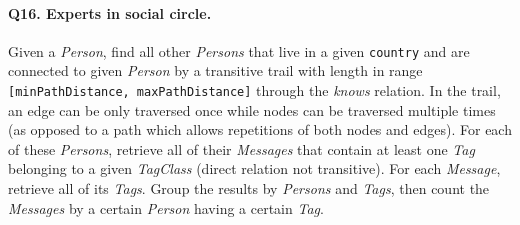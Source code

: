 \paragraph{\textbf{Q16}. Experts in social circle.}
Given a \emph{Person}, find all other \emph{Persons} that live in a
given \texttt{country} and are connected to given \emph{Person} by a
transitive trail with length in range
\texttt{{[}minPathDistance,\ maxPathDistance{]}} through the
\emph{knows} relation.
In the trail, an edge can be only traversed once while nodes can be
traversed multiple times (as opposed to a path which allows repetitions
of both nodes and edges).
For each of these \emph{Persons}, retrieve all of their \emph{Messages}
that contain at least one \emph{Tag} belonging to a given
\emph{TagClass} (direct relation not transitive). For each
\emph{Message}, retrieve all of its \emph{Tags}.
Group the results by \emph{Persons} and \emph{Tags}, then count the
\emph{Messages} by a certain \emph{Person} having a certain \emph{Tag}.
